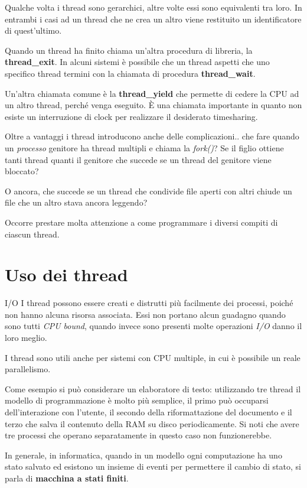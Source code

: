 Qualche volta i thread sono gerarchici, altre volte essi sono equivalenti tra loro. In entrambi i casi ad un thread che ne crea un altro viene restituito un identificatore di quest'ultimo.

Quando un thread ha finito chiama un'altra procedura di libreria, la \textbf{thread\_exit}. In alcuni sistemi è possibile che un thread aspetti che uno specifico thread termini con la chiamata di procedura \textbf{thread\_wait}.

Un'altra chiamata comune è la \textbf{thread\_yield} che permette di cedere la CPU ad un altro thread, perché venga eseguito. È una chiamata importante in quanto non esiste un interruzione di clock per realizzare il desiderato timesharing.

Oltre a vantaggi i thread introducono anche delle complicazioni.. che fare quando un \textit{processo} genitore ha thread multipli e chiama la \textit{fork()}? Se il figlio ottiene tanti thread quanti il genitore che succede se un thread del genitore viene bloccato?

O ancora, che succede se un thread che condivide file aperti con altri chiude un file che un altro stava ancora leggendo?

Occorre prestare molta attenzione a come programmare i diversi compiti di ciascun thread.

\section{Uso dei thread}
I/O
I thread possono essere creati e distrutti più facilmente dei processi, poiché non hanno alcuna risorsa associata.
Essi non portano alcun guadagno quando sono tutti \textit{CPU bound}, quando invece sono presenti molte operazioni \textit{I/O} danno il loro meglio.

I thread sono utili anche per sistemi con CPU multiple, in cui è possibile un reale parallelismo.

Come esempio si può considerare un elaboratore di testo: utilizzando tre thread il modello di programmazione è molto più semplice, il primo può occuparsi dell'interazione con l'utente, il secondo della riformattazione del documento e il terzo che salva il contenuto della RAM su disco periodicamente. Si noti che avere tre processi che operano separatamente in questo caso non funzionerebbe.

In generale, in informatica, quando in un modello ogni computazione ha uno stato salvato ed esistono un insieme di eventi per permettere il cambio di stato, si parla di \textbf{macchina a stati finiti}.

